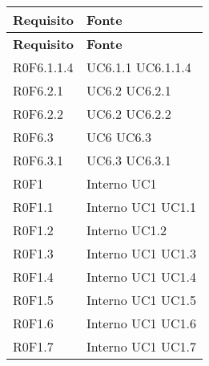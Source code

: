 \def\arraystretch{1.5}
\begin{longtable}{p{2.5cm}!{\VRule[1pt]}p{2.5cm}}
\color{white} \textbf{Requisito} & \color{white} \textbf{Fonte} \\ 
\endfirsthead 
{} 
\color{white} \textbf{Requisito} & \color{white} \textbf{Fonte} \\ 
\endhead 
R0F6.1.1.4 &  \newline UC6.1.1
 \newline UC6.1.1.4
 \\
R0F6.2.1 &  \newline UC6.2
 \newline UC6.2.1
 \\
R0F6.2.2 &  \newline UC6.2
 \newline UC6.2.2
 \\
R0F6.3 &  \newline UC6
 \newline UC6.3
 \\
R0F6.3.1 &  \newline UC6.3
 \newline UC6.3.1
 \\
R0F1 & Interno \newline UC1
 \\
R0F1.1 & Interno \newline UC1
 \newline UC1.1
 \\
R0F1.2 & Interno \newline UC1.2
 \\
R0F1.3 & Interno \newline UC1
 \newline UC1.3
 \\
R0F1.4 & Interno \newline UC1
 \newline UC1.4
 \\
R0F1.5 & Interno \newline UC1
 \newline UC1.5
 \\
R0F1.6 & Interno \newline UC1
 \newline UC1.6
 \\
R0F1.7 & Interno \newline UC1
 \newline UC1.7
 \\

\end{longtable}
